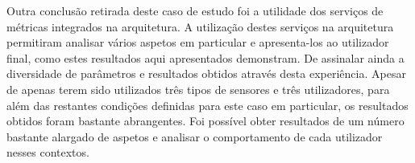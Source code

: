 Outra conclusão retirada deste caso de estudo foi a utilidade dos serviços de métricas integrados na arquitetura. A utilização destes serviços na arquitetura permitiram analisar vários aspetos em particular e apresenta-los ao utilizador final, como estes resultados aqui apresentados demonstram. De assinalar ainda a diversidade de parâmetros e resultados obtidos através desta experiência. Apesar de apenas terem sido utilizados três tipos de sensores e três utilizadores, para além das restantes condições definidas para este caso em particular, os resultados obtidos foram bastante abrangentes. Foi possível obter resultados de um número bastante alargado de aspetos e analisar o comportamento de cada utilizador nesses contextos.